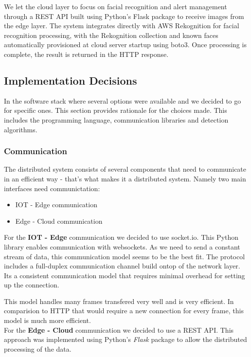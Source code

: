 \documentclass[conference]{IEEEtran}
\begin{document}
We let the cloud layer to focus on facial recognition and alert management through a REST API built using Python's Flask package to receive images from the edge layer. The system integrates directly with AWS Rekognition for facial recognition processing, with the Rekognition collection and known faces automatically provisioned at cloud server startup using boto3. Once processing is complete, the result is returned in the HTTP response. 

\subsection{Implementation Decisions}
In the software stack where several options were available and we decided to go for specific ones. This section provides rationale for the choices made. This includes the programming language, communication libraries and detection algorithms.
\\

\subsubsection{Communication}
The distributed system consists of several components that need to communicate in an efficient way - that's what makes it a distributed system. 
Namely two main interfaces need communictation:
\\
\begin{itemize}
    \item IOT - Edge communication
    \item Edge - Cloud communication
\end{itemize}

\hfill \break
For the \textbf{IOT - Edge} communication we decided to use socket.io. This Python library enables communication with websockets. As we need to send a constant stream of data, this communication model seems to be the best fit. The protocol includes a full-duplex communication channel build ontop of the network layer. Its a consistent communication model that requires minimal overhead for setting up the connection. 

This model handles many frames transfered very well and is very efficient. In comparision to HTTP that would require a new connection for every frame, this model is much more efficient. 
\\


For the \textbf{Edge - Cloud} communication we decided to use a REST API. This approach was implemented using Python's \textit{Flask} package to allow the distributed processing of the data. 
\end{document}
